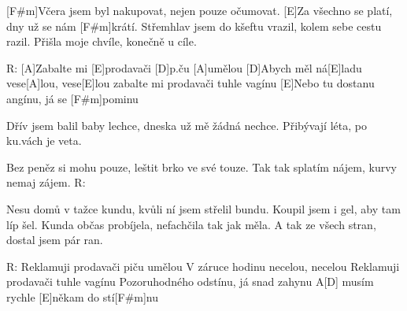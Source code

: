  
[F#m]Včera jsem byl nakupovat, nejen pouze očumovat.
[E]Za všechno se platí, dny už se nám [F#m]krátí. 
Střemhlav jsem do kšeftu vrazil, kolem sebe cestu razil.
Přišla moje chvíle, konečně u cíle.

R: [A]Zabalte mi [E]prodavači [D]p.ču [A]umělou
[D]Abych měl ná[E]ladu vese[A]lou, vese[E]lou
zabalte mi prodavači tuhle vagínu
[E]Nebo tu dostanu angínu, já se [F#m]pominu

Dřív jsem balil baby lechce, dneska už mě žádná nechce.
Přibývají léta, po ku.vách je veta.

Bez peněz si mohu pouze, leštit brko ve své touze.
Tak tak splatím nájem, kurvy nemaj zájem.
R: 

Nesu domů v tažce kundu, kvůli ní jsem střelil bundu.
Koupil jsem i gel, aby tam líp šel.
Kunda občas probíjela, nefachčila tak jak měla.
A tak ze všech stran, dostal jsem pár ran.

R: Reklamuji prodavači piču umělou
V záruce hodinu necelou, necelou
Reklamuji prodavači tuhle vagínu
Pozoruhodného odstínu, já snad zahynu
A[D] musím rychle [E]někam do stí[F#m]nu
